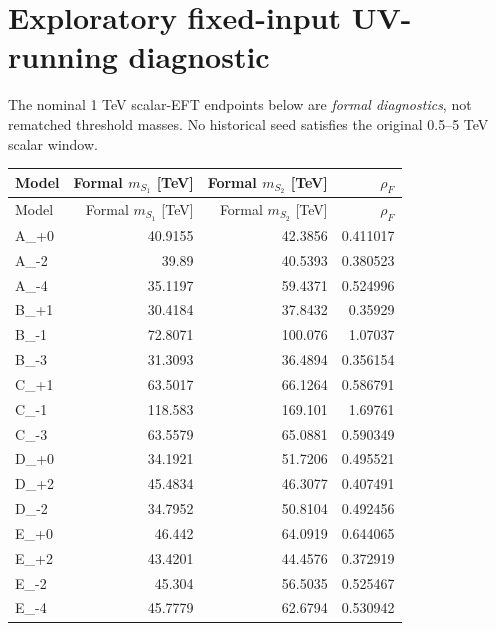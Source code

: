 \documentclass[10pt,a4paper]{article}
\begin{document}
\section*{Exploratory fixed-input UV-running diagnostic}
\noindent The nominal 1 TeV scalar-EFT endpoints below are \emph{formal diagnostics}, not rematched threshold masses. No historical seed satisfies the original 0.5--5 TeV scalar window.
\small\begin{longtable}{lrrr}
\toprule Model & Formal $m_{S_1}$ [TeV] & Formal $m_{S_2}$ [TeV] & $\rho_F$ \\
\midrule\endfirsthead
\toprule Model & Formal $m_{S_1}$ [TeV] & Formal $m_{S_2}$ [TeV] & $\rho_F$ \\
\midrule\endhead
A\_+0 & 40.9155 & 42.3856 & 0.411017 \\
A\_-2 & 39.89 & 40.5393 & 0.380523 \\
A\_-4 & 35.1197 & 59.4371 & 0.524996 \\
B\_+1 & 30.4184 & 37.8432 & 0.35929 \\
B\_-1 & 72.8071 & 100.076 & 1.07037 \\
B\_-3 & 31.3093 & 36.4894 & 0.356154 \\
C\_+1 & 63.5017 & 66.1264 & 0.586791 \\
C\_-1 & 118.583 & 169.101 & 1.69761 \\
C\_-3 & 63.5579 & 65.0881 & 0.590349 \\
D\_+0 & 34.1921 & 51.7206 & 0.495521 \\
D\_+2 & 45.4834 & 46.3077 & 0.407491 \\
D\_-2 & 34.7952 & 50.8104 & 0.492456 \\
E\_+0 & 46.442 & 64.0919 & 0.644065 \\
E\_+2 & 43.4201 & 44.4576 & 0.372919 \\
E\_-2 & 45.304 & 56.5035 & 0.525467 \\
E\_-4 & 45.7779 & 62.6794 & 0.530942 \\
\bottomrule\end{longtable}\normalsize
\end{document}
